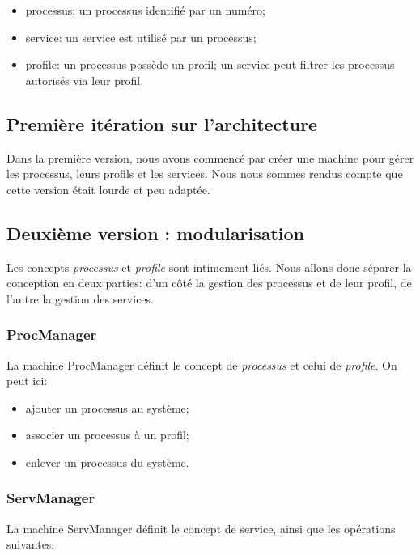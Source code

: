 \documentclass[french, titlepage, 11pt, a4paper]{article}
\begin{document}
\begin{itemize}
  \item processus: un processus identifié par un numéro;
  \item service: un service est utilisé par un processus;
  \item profile: un processus possède un profil; un service peut filtrer les
    processus autorisés via leur profil.
\end{itemize}

    \subsection{Première itération sur l'architecture}

        Dans la première version, nous avons commencé par créer une machine pour gérer
        les processus, leurs profils et les services.
        Nous nous sommes rendus compte que cette version était lourde et peu adaptée.

    \subsection{Deuxième version : modularisation}

        Les concepts \emph{processus} et \emph{profile} sont intimement liés.
        Nous allons donc séparer la conception en deux parties: d'un côté la gestion des
        processus et de leur profil, de l'autre la gestion des services.

        \subsubsection{ProcManager}

            La machine ProcManager définit le concept de \emph{processus} et celui de
            \emph{profile}. On peut ici:

                \begin{itemize}
                    \item ajouter un processus au système;
                    \item associer un processus à un profil;
                    \item enlever un processus du système.
                \end{itemize}

        \subsubsection{ServManager}
            La machine ServManager définit le concept de service, ainsi que les opérations suivantes:
\end{document}
